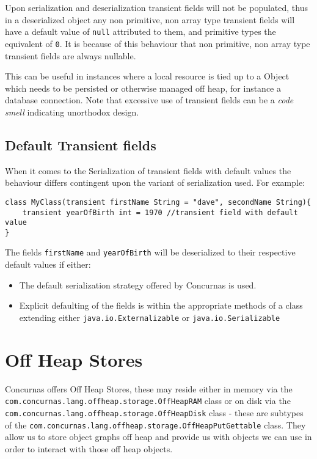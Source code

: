 \documentclass[conc-doc]{subfiles}
\begin{document}
Upon serialization and deserialization transient fields will not be populated, thus in a deserialized object any non primitive, non array type transient fields will have a default value of \lstinline{null} attributed to them, and primitive types the equivalent of \lstinline{0}. It is because of this behaviour that non primitive, non array type transient fields are always nullable.

This can be useful in instances where a local resource is tied up to a Object which needs to be persisted or otherwise managed off heap, for instance a database connection. Note that excessive use of transient fields can be a \textit{code smell} indicating unorthodox design.

\subsection{Default Transient fields}
When it comes to the Serialization of transient fields with default values the behaviour differs contingent upon the variant of serialization used. For example: 

\begin{lstlisting}
class MyClass(transient firstName String = "dave", secondName String){
	transient yearOfBirth int = 1970 //transient field with default value
}
\end{lstlisting}

The fields \lstinline{firstName} and \lstinline{yearOfBirth} will be deserialized to their respective default values if either:

\begin{itemize}
	\item The default serialization strategy offered by Concurnas is used.
	\item Explicit defaulting of the fields is within the appropriate methods of a class extending either \lstinline{java.io.Externalizable} or \lstinline{java.io.Serializable}
\end{itemize}

\section{Off Heap Stores}
Concurnas offers Off Heap Stores, these may reside either in memory via the \lstinline{com.concurnas.lang.offheap.storage.OffHeapRAM} class or on disk via the \lstinline{com.concurnas.lang.offheap.storage.OffHeapDisk} class - these are subtypes of the \lstinline{com.concurnas.lang.offheap.storage.OffHeapPutGettable} class. They allow us to store object graphs off heap and provide us with objects we can use in order to interact with those off heap objects.
\end{document}
